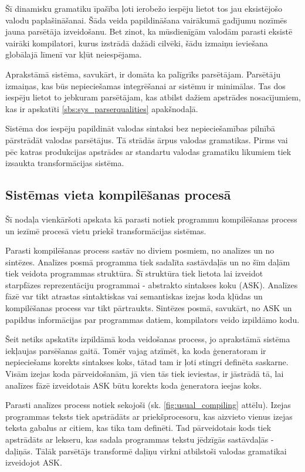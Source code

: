 Šī dinamisku gramatiku īpašība ļoti ierobežo iespēju lietot tos jau eksistējošo valodu paplašināšanai. Šāda veida papildināšana vairākumā gadījumu nozīmēs jauna parsētāja izveidošanu. Bet zinot, ka mūsdienīgām valodām parasti eksistē vairāki kompilatori, kurus izstrādā dažādi cilvēki, šādu izmaiņu ieviešana globālajā līmenī var kļūt neiespējama.

Aprakstāmā sistēma, savukārt, ir domāta ka palīgrīks parsētājam. Parsētāju izmaiņas, kas būs nepieciešamas integrēšanai ar sistēmu ir minimālas. Tas dos iespēju lietot to jebkuram parsētājam, kas atbilst dažiem apstrādes nosacījumiem, kas ir apskatīti \ref{sbs:sys_parserqualities} apakšnodaļā.

Sistēma dos iespēju papildināt valodas sintaksi bez nepieciešamības pilnībā pārstrādāt valodas parsētājus. Tā strādās ārpus valodas gramatikas. Pirms vai pēc katras produkcijas apstrādes ar standartu valodas gramatiku likumiem tiek izsaukta transformācijas sistēma. 

\subsection{Sistēmas vieta kompilēšanas procesā}

Šī nodaļa vienkāršoti apskata kā parasti notiek programmu kompilēšanas process un iezīmē procesā vietu priekš transformācijas sistēmas.

Parasti kompilēšanas process sastāv no diviem posmiem, no analīzes un no sintēzes. Analīzes posmā programma tiek sadalīta sastāvdaļās un no šīm daļām tiek veidota programmas struktūra. Šī struktūra tiek lietota lai izveidot starpfāzes reprezentāciju programmai - abstrakto sintakses koku (ASK). Analīzes fāzē var tikt atrastas sintaktiskas vai semantiskas izejas koda kļūdas un kompilēšanas process var tikt pārtraukts. Sintēzes posmā, savukārt, no ASK un papildus informācijas par programmas datiem, kompilators veido izpildāmo kodu.

Šeit netiks apskatīts izpildāmā koda veidošanas process, jo aprakstāmā sistēma iekļaujas parsēšanas gaitā. Tomēr vajag atzīmēt, ka koda ģeneratoram ir nepieciešams korekts sintakses koks, tātad tam ir ļoti stingri definēta saskarne. Visām izejas koda pārveidošanām, jā vien tās tiek ieviestas, ir jāstrādā tā, lai analīzes fāzē izveidotais ASK būtu korekts koda ģeneratora ieejas koks.

Parasti analīzes process notiek sekojoši (sk. \ref{fig:usual_compiling} attēlu). Izejas programmas teksts tiek apstrādāts ar priekšprocesoru, kas aizvieto vienus izejas teksta gabalus ar citiem, kas tika tam definēti. Tad pārveidotais kods tiek apstrādāts ar lekseru, kas sadala programmas tekstu jēdzīgās sastāvdaļās - daļiņās. Tālāk parsētājs transformē daļiņu virkni atbilstoši valodas gramatikai izveidojot ASK.

